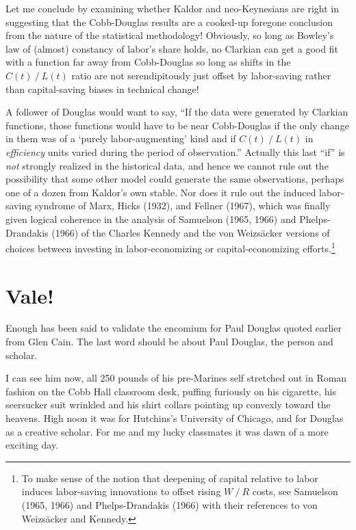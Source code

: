 \documentclass{article}
\begin{document}
Let me conclude by examining whether Kaldor and neo-Keynesians are right in suggesting that the Cobb-Douglas results are a cooked-up foregone conclusion from the nature of the statistical methodology! Obviously, so long as Bowley's law of (almost) constancy of labor's share holds, no Clarkian can get a good fit with a function far away from Cobb-Douglas so long as shifts in the \(C(t)⁄L(t)\) ratio are not serendipitously just offset by labor-saving rather than capital-saving biases in technical change!

A follower of Douglas would want to say, ``If the data were generated by Clarkian functions, those functions would have to be near Cobb-Douglas if the only change in them was of a `purely labor-augmenting' kind and if \(C(t)⁄L(t)\) in \emph{efficiency} units varied during the period of observation.'' Actually this last ``if'' is \emph{not} strongly realized in the historical data, and hence we cannot rule out the possibility that some other model could generate the same observations, perhaps one of a dozen from Kaldor's own stable. Nor does it rule out the induced labor-saving syndrome of Marx, Hicks (1932), and Fellner (1967), which was finally given logical coherence in the analysis of Samuelson (1965, 1966) and Phelps-Drandakis (1966) of the Charles Kennedy and the von Weizs\"acker versions of choices between investing in labor-economizing or capital-economizing efforts.\footnote{To make sense of the notion that deepening of capital relative to labor induces labor-saving innovations to offset rising \(W⁄R\) costs, see Samuelson (1965, 1966) and Phelps-Drandakis (1966) with their references to von Weizs\"acker and Kennedy.}

\section*{Vale!}

Enough has been said to validate the encomium for Paul Douglas quoted earlier from Glen Cain. The last word should be about Paul Douglas, the person and scholar.

I can see him now, all 250 pounds of his pre-Marines self stretched out in Roman fashion on the Cobb Hall classroom desk, puffing furiously on his cigarette, his seersucker suit wrinkled and his shirt collars pointing up convexly toward the heavens. High noon it was for Hutchins's University of Chicago, and for Douglas as a creative %
scholar. For me and my lucky classmates it was dawn of a more exciting day.
\end{document}
